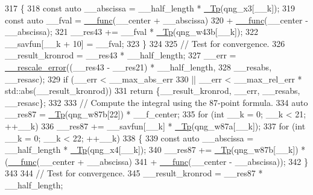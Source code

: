 \begin{DoxyCode}
317         \{
318           \textcolor{keyword}{const} \textcolor{keyword}{auto} \_\_abscissa = \_\_half\_length * \hyperlink{namespace____gnu__cxx_a3b19a9c800ca194374ef9172290f7d79}{\_Tp}(qng\_x3[\_\_k]);
319           \textcolor{keyword}{const} \textcolor{keyword}{auto} \_\_fval = \hyperlink{namespace____gnu__cxx_af2b2f0c7a2ae72b922b1afefae5a65b2}{\_\_func}(\_\_center + \_\_abscissa)
320                             + \hyperlink{namespace____gnu__cxx_af2b2f0c7a2ae72b922b1afefae5a65b2}{\_\_func}(\_\_center - \_\_abscissa);
321           \_\_res43 += \_\_fval * \hyperlink{namespace____gnu__cxx_a3b19a9c800ca194374ef9172290f7d79}{\_Tp}(qng\_w43b[\_\_k]);
322           \_\_savfun[\_\_k + 10] = \_\_fval;
323         \}
324 
325       \textcolor{comment}{// Test for convergence.}
326       \_\_result\_kronrod = \_\_res43 * \_\_half\_length;
327       \_\_err = \hyperlink{namespace____gnu__cxx_aeff8a54364ae3976f593b8699626a897}{\_\_rescale\_error}((\_\_res43 - \_\_res21) * \_\_half\_length,
328                                  \_\_resabs, \_\_resasc);
329       \textcolor{keywordflow}{if} (\_\_err < \_\_max\_abs\_err
330        || \_\_err < \_\_max\_rel\_err * std::abs(\_\_result\_kronrod))
331         \textcolor{keywordflow}{return} \{\_\_result\_kronrod, \_\_err, \_\_resabs, \_\_resasc\};
332 
333       \textcolor{comment}{// Compute the integral using the 87-point formula.}
334       \textcolor{keyword}{auto} \_\_res87 = \hyperlink{namespace____gnu__cxx_a3b19a9c800ca194374ef9172290f7d79}{\_Tp}(qng\_w87b[22]) * \_\_f\_center;
335       \textcolor{keywordflow}{for} (\textcolor{keywordtype}{int} \_\_k = 0; \_\_k < 21; ++\_\_k)
336         \_\_res87 += \_\_savfun[\_\_k] * \hyperlink{namespace____gnu__cxx_a3b19a9c800ca194374ef9172290f7d79}{\_Tp}(qng\_w87a[\_\_k]);
337       \textcolor{keywordflow}{for} (\textcolor{keywordtype}{int} \_\_k = 0; \_\_k < 22; ++\_\_k)
338         \{
339           \textcolor{keyword}{const} \textcolor{keyword}{auto} \_\_abscissa = \_\_half\_length * \hyperlink{namespace____gnu__cxx_a3b19a9c800ca194374ef9172290f7d79}{\_Tp}(qng\_x4[\_\_k]);
340           \_\_res87 += \hyperlink{namespace____gnu__cxx_a3b19a9c800ca194374ef9172290f7d79}{\_Tp}(qng\_w87b[\_\_k]) * (\hyperlink{namespace____gnu__cxx_af2b2f0c7a2ae72b922b1afefae5a65b2}{\_\_func}(\_\_center + \_\_abscissa)
341                                          + \hyperlink{namespace____gnu__cxx_af2b2f0c7a2ae72b922b1afefae5a65b2}{\_\_func}(\_\_center - \_\_abscissa));
342         \}
343 
344       \textcolor{comment}{// Test for convergence.}
345       \_\_result\_kronrod = \_\_res87 * \_\_half\_length;

\end{DoxyCode}
